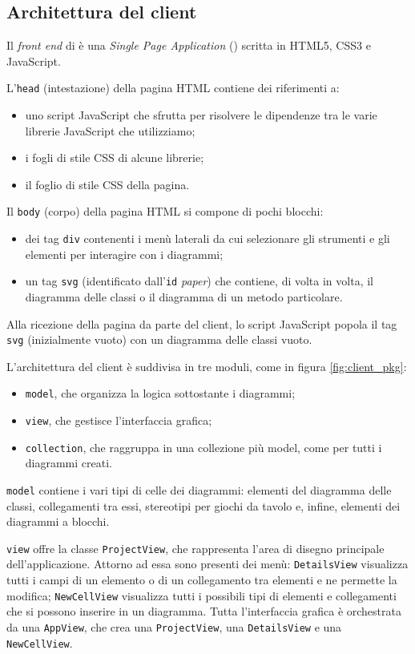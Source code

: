 \subsection{Architettura del client} \label{sec:arch_client}
Il \emph{front end} di \proj{} è una \emph{Single Page Application} () scritta in HTML5, CSS3 e JavaScript.

L'\texttt{head} (intestazione) della pagina HTML contiene dei riferimenti a:
\begin{itemize}
	\item uno script JavaScript che sfrutta \requirejs per risolvere le dipendenze tra le varie librerie JavaScript che utilizziamo;
	\item i fogli di stile CSS di alcune librerie;
	\item il foglio di stile CSS della pagina.
\end{itemize}

Il \texttt{body} (corpo) della pagina HTML si compone di pochi blocchi:
\begin{itemize}
	\item dei tag \texttt{div} contenenti i menù laterali da cui selezionare gli strumenti e gli elementi per interagire con i diagrammi;
	\item un tag \texttt{svg} (identificato dall'\texttt{id} \emph{paper}) che contiene, di volta in volta, il diagramma delle classi o il diagramma di un metodo particolare.
\end{itemize}
Alla ricezione della pagina da parte del client, lo script JavaScript popola il tag \texttt{svg} (inizialmente vuoto) con un diagramma delle classi vuoto.

L'architettura del client è suddivisa in tre moduli, come in figura \ref{fig:client_pkg}:
\begin{itemize}
	\item \texttt{model}, che organizza la logica sottostante i diagrammi;
	\item \texttt{view}, che gestisce l'interfaccia grafica;
	\item \texttt{collection}, che raggruppa in una collezione più model, come per tutti i diagrammi creati. %
\end{itemize}

\texttt{model} contiene i vari tipi di celle dei diagrammi: elementi del diagramma delle classi, collegamenti tra essi, stereotipi per giochi da tavolo e, infine, elementi dei diagrammi a blocchi. %

\texttt{view} offre la classe \texttt{ProjectView}, che rappresenta l'area di disegno principale dell'applicazione. Attorno ad essa sono presenti dei menù: \texttt{DetailsView} visualizza tutti i campi di un elemento o di un collegamento tra elementi e ne permette la modifica; \texttt{NewCellView} visualizza tutti i possibili tipi di elementi e collegamenti che si possono inserire in un diagramma. Tutta l'interfaccia grafica è orchestrata da una \texttt{AppView}, che crea una \texttt{ProjectView}, una \texttt{DetailsView} e una \texttt{NewCellView}.

